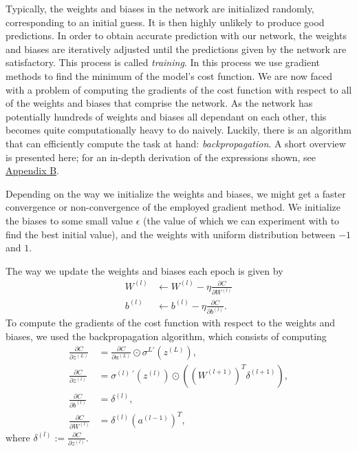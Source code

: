 \documentclass[aps,reprint,superscriptaddress,nofootinbib]{revtex4-2}
\begin{document}
Typically, the weights and biases in the network are initialized randomly, corresponding to an initial guess.
It is then highly unlikely to produce good predictions. In order to obtain accurate prediction with our network, the weights and biases are iteratively adjusted until the predictions given by the network are satisfactory. This process is called \textit{training}. In this process we use gradient methods to find the minimum of the model's cost function. We are now faced with a problem of computing the gradients of the cost function with respect to all of the weights and biases that comprise the network. As the network has potentially hundreds of weights and biases all dependant on each other, this becomes quite computationally heavy to do naively. Luckily, there is an algorithm that can efficiently compute the task at hand: \textit{backpropagation}. A short overview is presented here; for an in-depth derivation of the expressions shown, see \hyperref[sec:backprop]{Appendix B}.

Depending on the way we initialize the weights and biases, we might get a faster convergence or non-convergence of the employed gradient method. We initialize the biases to some small value $\epsilon$ (the value of which we can experiment with to find the best initial value), and the weights with uniform distribution between $-1$ and $1$. %

The way we update the weights and biases each epoch is given by
\begin{align*}
    W^{(l)} &\xleftarrow{} W^{(l)} - \eta \frac{\partial C}{\partial W^{(l)}}
    \\
    b^{(l)} &\xleftarrow{} b^{(l)} - \eta \frac{\partial C}{\partial b^{(l)}}.
\end{align*}
To compute the gradients of the cost function with respect to the weights and biases, we used the backpropagation algorithm, which consists of computing
\begin{align*}
    \frac{\partial C}{\partial z^{(L)}} &= \frac{\partial C}{\partial a^{(L)}}\odot\sigma^{L\prime}(z^{(L)}),
    \\
    \frac{\partial C}{\partial z^{(l)}} &= \sigma^{(l)\;\prime}(z^{(l)})\odot((W^{(l+1)})^T\delta^{(l+1)}),
    \\
    \frac{\partial C}{\partial b^{(l)}} &= \delta^{(l)},
    \\
    \frac{\partial C}{\partial W^{(l)}} &= \delta^{(l)}(a^{(l-1)})^T,
\end{align*}
where \(\delta^{(l)} := \frac{\partial C}{\partial z^{(l)}}\).
\end{document}
